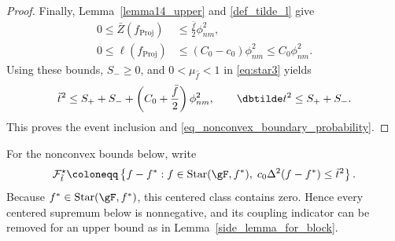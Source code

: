 \documentclass[twoside,11pt]{article}
\newenvironment{revision}{\color{revisionred}}{}
\begin{document}
\begin{revision}
\begin{proof}
Finally, Lemma~\ref{lemma14_upper} and \eqref{def_tilde_l} give
\begin{align*}
0\leq\bar Z(f_{\text{Proj}})
&\leq\frac{\bar f}{2}\phi_{nm}^2,\\
0\leq\ell(f_{\text{Proj}})
&\leq(C_0-c_0)\phi_{nm}^2\leq C_0\phi_{nm}^2.
\end{align*}
Using these bounds, $S_-\geq0$, and $0<\mu_{\hat f}<1$ in
\eqref{eq:star3} yields
\[
\tilde t^2\leq S_++S_-+
                  \left(C_0+\frac{\bar f}{2}\right)\phi_{nm}^2,
\qquad
\dbtilde t^2\leq S_++S_-.
\]
This proves the event inclusion and
\eqref{eq_nonconvex_boundary_probability}.
\end{proof}
\end{revision}


\begin{revision}
For the nonconvex bounds below, write
\[
\mathcal F_{\tilde t}^{\star}
\coloneqq
\left\{f-f^*:f\in\text{Star}(\gF,f^*),\;
c_0\Delta^2(f-f^*)\leq\tilde t^2\right\}.
\]
Because $f^*\in\text{Star}(\gF,f^*)$, this centered class contains zero. Hence every centered supremum below is nonnegative, and its coupling indicator can be removed for an upper bound as in Lemma~\ref{side_lemma_for_block}.
\end{revision}
\end{document}
